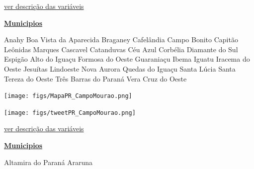\documentclass[10pt]{article} %
\begin{document}
\begin{minipage}[t]{.66\linewidth}
\begin{center}

\end{center}
\small{\hyperlink{vartab}{ver descrição das variáveis}}\end{minipage}\hfill\begin{minipage}[t]{.30\linewidth}
\begin{mdframed}[style=sidebar,frametitle={}]
\textbf{\hyperlink{municips}{Municipios}}\begin{itemize}\gsquare Anahy 
\gsquare Boa Vista da Aparecida 
\gsquare Braganey 
\gsquare Cafelândia 
\gsquare Campo Bonito 
\gsquare Capitão Leônidas Marques 
\gsquare Cascavel 
\gsquare Catanduvas 
\gsquare Céu Azul 
\gsquare Corbélia 
\gsquare Diamante do Sul 
\gsquare Espigão Alto do Iguaçu 
\gsquare Formosa do Oeste 
\gsquare Guaraniaçu 
\gsquare Ibema 
\gsquare Iguatu 
\gsquare Iracema do Oeste 
\gsquare Jesuítas 
\gsquare Lindoeste 
\gsquare Nova Aurora 
\gsquare Quedas do Iguaçu 
\gsquare Santa Lúcia 
\gsquare Santa Tereza do Oeste 
\gsquare Três Barras do Paraná 
\gsquare Vera Cruz do Oeste 
\end{itemize}\BackToContents\end{mdframed}\hfill\end{minipage}\newpage\begin{minipage}[t]{.66\linewidth}
\hypertarget{CmpM}{}
\texttt{[image: figs/MapaPR\_CampoMourao.png]}\vspace{0.5cm}\vspace{0.5cm}\begin{center}
\texttt{[image: figs/tweetPR\_CampoMourao.png]}\end{center}
\begin{center}

\end{center}
\small{\hyperlink{vartab}{ver descrição das variáveis}}\end{minipage}\hfill\begin{minipage}[t]{.30\linewidth}
\begin{mdframed}[style=sidebar,frametitle={}]
\textbf{\hyperlink{municips}{Municipios}}\begin{itemize}\gsquare Altamira do Paraná 
\gsquare Araruna 

\end{itemize}
\end{mdframed}
\end{minipage}
\end{document}
